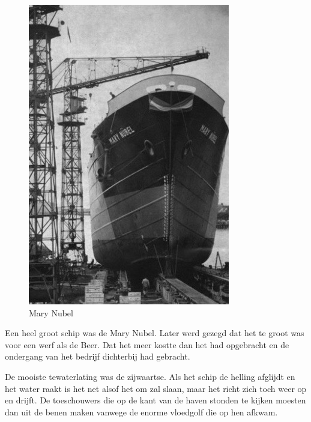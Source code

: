 \documentclass[10pt,twoside, openright]{memoir}
\begin{document}
\begin{figure}
\includegraphics[width=\textwidth]{img/ch15/schuttevaer12}
\caption*{\footnotesize Mary Nubel}
\end{figure}

Een heel groot schip was de Mary Nubel. Later werd gezegd dat het te groot was voor een werf als de Beer. Dat het meer kostte dan het had opgebracht en de ondergang van het bedrijf dichterbij had gebracht. 

De mooiste tewaterlating was de zijwaartse. Als het schip de helling afglijdt en het water raakt is het net alsof het om zal slaan, maar het richt zich toch weer op en drijft. De toeschouwers die op de kant van de haven stonden te kijken moesten dan uit de benen maken vanwege de enorme vloedgolf die op hen afkwam.
\end{document}
